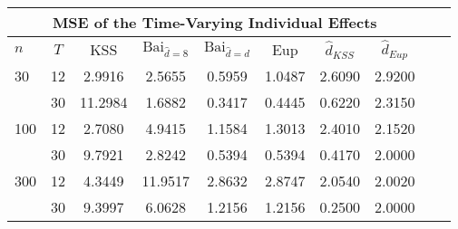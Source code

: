 \begin{tabular}{lccccccccc} 
\hline \multicolumn{8}{c}{MSE of the Time-Varying Individual Effects} \\ \hline 
$n$ & $T$ & KSS & $ \text{Bai}_{\hat{d} = 8}$ & $\text{Bai}_{\hat{d} = d}$ & Eup & $\hat{d}_{KSS}$ & $\hat{d}_{Eup}$ \\
\hline
30 & 12 &  2.9916  &  2.5655  &  0.5959  &  1.0487  &  2.6090  &  2.9200  \\
& 30 &  11.2984  &  1.6882  &  0.3417  &  0.4445  &  0.6220  &  2.3150  \\
100 & 12 &  2.7080  &  4.9415  &  1.1584  &  1.3013  &  2.4010  &  2.1520  \\
& 30 &  9.7921  &  2.8242  &  0.5394  &  0.5394  &  0.4170  &  2.0000  \\
300 & 12 &  4.3449  &  11.9517  &  2.8632  &  2.8747  &  2.0540  &  2.0020  \\
& 30 &  9.3997  &  6.0628  &  1.2156  &  1.2156  &  0.2500  &  2.0000  \\
\end{tabular} 
